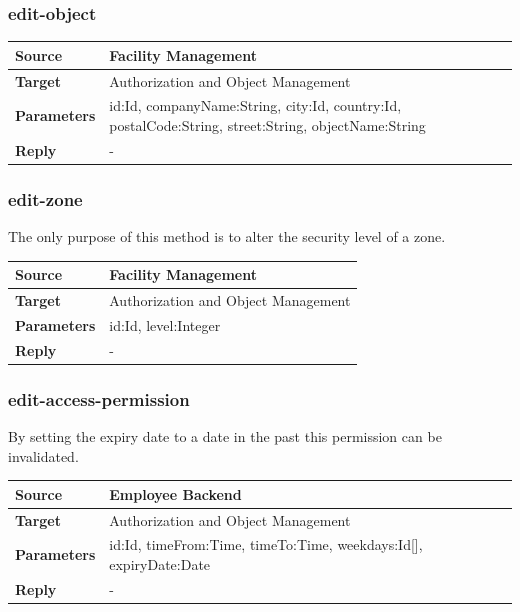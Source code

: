 \documentclass[12pt,a4paper,titlepage,oneside]{scrartcl}
\begin{document}
\subsubsection{edit-object}
\begin{table}[h]
    \centering
    \begin{tabular}{|l|p{12cm}|} \hline
    \textbf{Source}&Facility Management\\ \hline
    \textbf{Target}&Authorization and Object Management\\ \hline
    \textbf{Parameters}&id:Id, companyName:String, city:Id, country:Id, postalCode:String, street:String, objectName:String\\ \hline
    \textbf{Reply}&-\\ \hline
    \end{tabular}
\end{table}

\pagebreak

\subsubsection{edit-zone}
The only purpose of this method is to alter the security level of a zone.

\begin{table}[h]
    \centering
    \begin{tabular}{|l|p{12cm}|} \hline
    \textbf{Source}&Facility Management\\ \hline
    \textbf{Target}&Authorization and Object Management\\ \hline
    \textbf{Parameters}&id:Id, level:Integer\\ \hline
    \textbf{Reply}&-\\ \hline
    \end{tabular}
\end{table}

\subsubsection{edit-access-permission}
By setting the expiry date to a date in the past this permission can be invalidated.

\begin{table}[h]
    \centering
    \begin{tabular}{|l|p{12cm}|} \hline
    \textbf{Source}&Employee Backend\\ \hline
    \textbf{Target}&Authorization and Object Management\\ \hline
    \textbf{Parameters}&id:Id, timeFrom:Time, timeTo:Time, weekdays:Id[], expiryDate:Date\\ \hline
    \textbf{Reply}&-\\ \hline
    \end{tabular}
\end{table}
\end{document}
